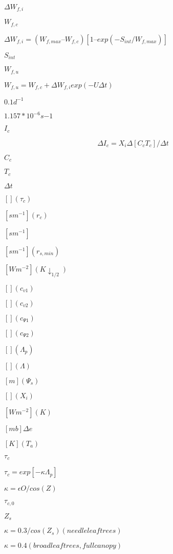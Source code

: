 \documentclass{article}
\begin{document}
$\Delta W_{f,i}$
\pagebreak

$W_{f,c}$
\pagebreak

$\Delta W_{f,i} = (W_{f,max} – W_{f,c} ) [1 – exp(-S_{int} /W_{f,max} )]$
\pagebreak

$S_{int}$
\pagebreak

$W_{f,u}$
\pagebreak

$W_{f,u} = {W_{f,c} + \Delta W_{f,i} } exp (-U \Delta t)$
\pagebreak

$0.1 d^{-1}$
\pagebreak

$1.157 * 10^{-6} s{-1}$
\pagebreak

$I_c$
\pagebreak

\[ \Delta I_c = X_i \Delta [C_c T_c ] / \Delta t \]
\pagebreak

$C_c$
\pagebreak

$T_c$
\pagebreak

$\Delta t$
\pagebreak

$[ ] (\tau_c)$
\pagebreak

$[s m^{-1}] (r_c)$
\pagebreak

$[s m^{-1}]$
\pagebreak

$[s m^{-1}] (r_{s,min})$
\pagebreak

$[W m^{-2}] (K \downarrow_{1/2})$
\pagebreak

$[ ] (c_{v1})$
\pagebreak

$[ ] (c_{v2})$
\pagebreak

$[ ] (c_{\Psi 1})$
\pagebreak

$[ ] (c_{\Psi 2})$
\pagebreak

$[ ] (\Lambda_p)$
\pagebreak

$[ ] (\Lambda)$
\pagebreak

$[m] (\Psi_s)$
\pagebreak

$[ ] (X_i) $
\pagebreak

$[W m^{-2}] (K)$
\pagebreak

$[mb] {\Delta e }$
\pagebreak

$[K] (T_a) $
\pagebreak

$\tau_c$
\pagebreak

$\tau_c = exp[-\kappa \Lambda_p]$
\pagebreak

$\kappa = \epsilon O/cos(Z)$
\pagebreak

$\tau_{c,0}$
\pagebreak

$Z_s$
\pagebreak

$\kappa = 0.3/cos(Z_s) (needleleaf trees)$
\pagebreak

$\kappa = 0.4 (broadleaf trees, full canopy)$
\pagebreak
\end{document}
